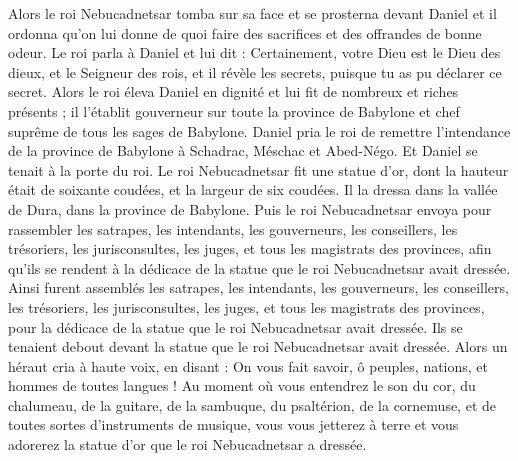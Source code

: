 \begin{multicols}{2}
Alors le roi Nebucadnetsar tomba sur sa face et se prosterna devant Daniel et il ordonna qu'on lui donne de quoi faire des sacrifices et des offrandes de bonne odeur.
Le roi parla à Daniel et lui dit : Certainement, votre Dieu est le Dieu des dieux, et le Seigneur des rois, et il révèle les secrets, puisque tu as pu déclarer ce secret.
Alors le roi éleva Daniel en dignité et lui fit de nombreux et riches présents ; il l'établit gouverneur sur toute la province de Babylone et chef suprême de tous les sages de Babylone.
Daniel pria le roi de remettre l'intendance de la province de Babylone à Schadrac, Méschac et Abed-Négo. Et Daniel se tenait à la porte du roi.
\VerseOne{}Le roi Nebucadnetsar fit une statue d'or, dont la hauteur était de soixante coudées, et la largeur de six coudées. Il la dressa dans la vallée de Dura, dans la province de Babylone.
Puis le roi Nebucadnetsar envoya pour rassembler les satrapes, les intendants, les gouverneurs, les conseillers, les trésoriers, les jurisconsultes, les juges, et tous les magistrats des provinces, afin qu'ils se rendent à la dédicace de la statue que le roi Nebucadnetsar avait dressée.
Ainsi furent assemblés les satrapes, les intendants, les gouverneurs, les conseillers, les trésoriers, les jurisconsultes, les juges, et tous les magistrats des provinces, pour la dédicace de la statue que le roi Nebucadnetsar avait dressée. Ils se tenaient debout devant la statue que le roi Nebucadnetsar avait dressée.
Alors un héraut cria à haute voix, en disant : On vous fait savoir, ô peuples, nations, et hommes de toutes langues !
Au moment où vous entendrez le son du cor, du chalumeau, de la guitare, de la sambuque, du psaltérion, de la cornemuse, et de toutes sortes d'instruments de musique, vous vous jetterez à terre et vous adorerez la statue d'or que le roi Nebucadnetsar a dressée.

\end{multicols}
